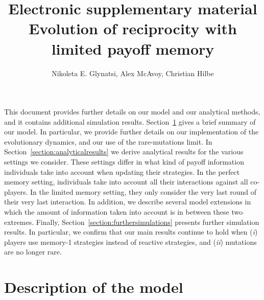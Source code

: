 \documentclass[11pt]{article}
\title{{ \sffamily \LARGE Electronic supplementary material}\\{\bf \sffamily \LARGE Evolution of reciprocity with limited payoff memory}}
\date{}
\author{Nikoleta E. Glynatsi, Alex McAvoy,  Christian Hilbe}
\theoremstyle{plainCl1}
\theoremstyle{plainCl2}
\begin{document}
\maketitle



\noindent
This document provides further details on our model and our analytical methods, and it contains additional simulation results. 
Section~\ref{section:model} gives a brief summary of our model. 
In particular, we provide further details on our implementation of the evolutionary dynamics, and our use of the rare-mutations limit. 
In Section~\ref{section:analyticalresults} we derive analytical results for the various settings we consider.
These settings differ in what kind of payoff information individuals take into account when updating their strategies. 
In the perfect memory setting, individuals take into account all their interactions against all co-players.
In the limited memory setting, they only consider the very last round of their very last interaction.  
In addition, we describe several model extensions in which the amount of information taken into account is in between these two extremes. 
Finally, Section~\ref{section:furthersimulations} presents further simulation results. 
In particular, we confirm that our main results continue to hold when ({\it i}) players use memory-1 strategies instead of reactive strategies, and  ({\it ii}) mutations are no longer rare.




\section{Description of the model}\label{section:model}

\end{document}
